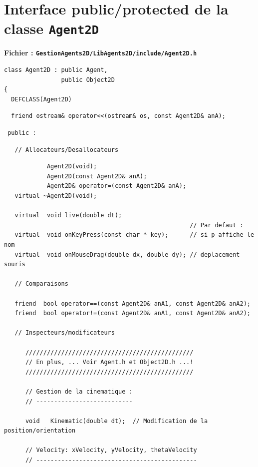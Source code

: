 \documentclass[12pt]{article}
\begin{document}
\section{Interface public/protected de la classe {\tt Agent2D}}

\begin{center}
{\bf Fichier : {\tt GestionAgents2D/LibAgents2D/include/Agent2D.h}}
\end{center}

\vspace{-0.4cm}
\begin{small}
\begin{verbatim}
class Agent2D : public Agent,
                public Object2D
{
  DEFCLASS(Agent2D)
\end{verbatim}
\begin{verbatim}
  friend ostream& operator<<(ostream& os, const Agent2D& anA);
\end{verbatim}
\begin{verbatim}
 public :
\end{verbatim}
\begin{verbatim}
   // Allocateurs/Desallocateurs
\end{verbatim}
\begin{verbatim}
            Agent2D(void);
            Agent2D(const Agent2D& anA);
            Agent2D& operator=(const Agent2D& anA);
   virtual ~Agent2D(void);

   virtual  void live(double dt);
                                                    // Par defaut :
   virtual  void onKeyPress(const char * key);      // si p affiche le nom
   virtual  void onMouseDrag(double dx, double dy); // deplacement souris

   // Comparaisons

   friend  bool operator==(const Agent2D& anA1, const Agent2D& anA2);
   friend  bool operator!=(const Agent2D& anA1, const Agent2D& anA2);

   // Inspecteurs/modificateurs

      ///////////////////////////////////////////////
      // En plus, ... Voir Agent.h et Object2D.h ...!
      ///////////////////////////////////////////////

      // Gestion de la cinematique :
      // ---------------------------

      void   Kinematic(double dt);  // Modification de la position/orientation

      // Velocity: xVelocity, yVelocity, thetaVelocity
      // ---------------------------------------------


\end{verbatim}
\end{small}
\end{document}
